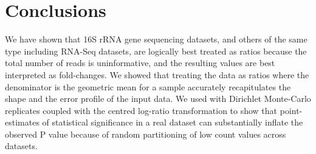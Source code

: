 \documentclass[11pt]{article}\usepackage[]{graphicx}\usepackage[]{color}
\begin{document}
\section{Conclusions}
We have shown that 16S rRNA gene sequencing datasets, and others of the same type including RNA-Seq datasets, are logically best treated as ratios because the total number of reads is uninformative, and the resulting values are best interpreted as fold-changes. We showed that treating the data as ratios where the denominator is the geometric mean for a sample accurately recapitulates the shape and the error profile of the input data. We used with Dirichlet Monte-Carlo replicates coupled with the centred log-ratio transformation to show that point-estimates of statistical significance in a real dataset can substantially inflate the observed P value because of random partitioning of low count values across datasets. 



\end{document}
